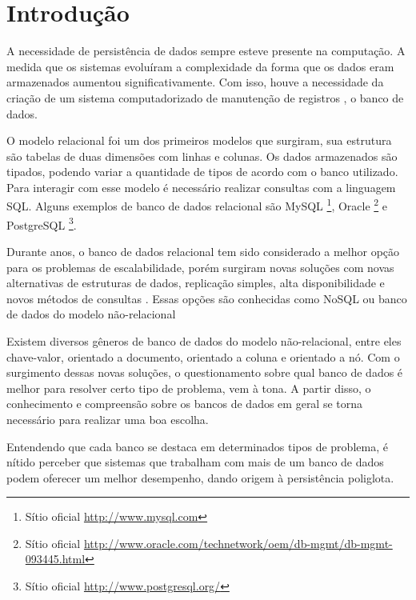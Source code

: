 \chapter{Introdução}\label{chap:introducao}
A necessidade de persistência de dados sempre esteve presente na computação. A medida que os sistemas evoluíram a complexidade da forma que os dados eram armazenados aumentou significativamente. Com isso, houve a necessidade da criação de um sistema computadorizado de manutenção de registros \cite{CJDate}, o banco de dados.

O modelo relacional foi um dos primeiros modelos que surgiram, sua estrutura são tabelas de duas dimensões com linhas e colunas. Os dados armazenados são tipados, podendo variar a quantidade de tipos de acordo com o banco utilizado. Para interagir com esse modelo é necessário realizar consultas com a linguagem \ac{SQL}. Alguns exemplos de banco de dados relacional são MySQL \footnote{Sítio oficial  \url{http://www.mysql.com}}, Oracle \footnote{Sítio oficial  \url{http://www.oracle.com/technetwork/oem/db-mgmt/db-mgmt-093445.html}} e PostgreSQL \footnote{Sítio oficial \url{http://www.postgresql.org/}}.

Durante anos, o banco de dados relacional tem sido considerado a melhor opção para os problemas de escalabilidade, porém surgiram novas soluções com novas alternativas de estruturas de dados, replicação simples, alta disponibilidade e novos métodos de consultas \cite{SDSW}. Essas opções são conhecidas como NoSQL ou banco de dados do modelo não-relacional

Existem diversos gêneros de banco de dados do modelo não-relacional, entre eles chave-valor, orientado a documento, orientado a coluna e orientado a nó. Com o surgimento dessas novas soluções, o questionamento sobre qual banco de dados é melhor para resolver certo tipo de problema, vem à tona. A partir disso, o conhecimento e compreensão sobre os bancos de dados em geral se torna necessário para realizar uma boa escolha.

Entendendo que cada banco se destaca em determinados tipos de problema, é nítido perceber que sistemas que trabalham com mais de um banco de dados podem oferecer um melhor desempenho, dando origem à persistência poliglota.

